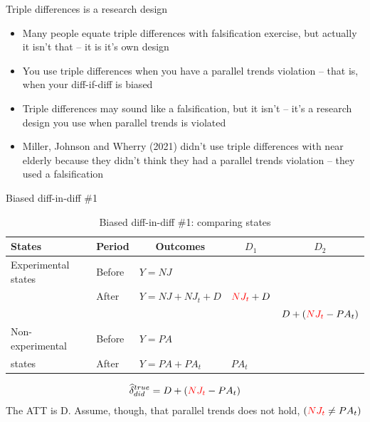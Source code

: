 \documentclass[aspectratio=169,11pt]{beamer}
\begin{document}

\begin{frame}{Triple differences is a research design}

\begin{itemize}

\item Many people equate triple differences with falsification exercise, but actually it isn't that -- it is it's own design
\item You use triple differences when you have a parallel trends violation -- that is, when your diff-if-diff is biased
\item Triple differences may sound like a falsification, but it isn't -- it's a research design you use when parallel trends is violated
\item Miller, Johnson and Wherry (2021) didn't use triple differences with near elderly because they didn't think they had a parallel trends violation -- they used a falsification
\end{itemize}

\end{frame}




\begin{frame}{Biased diff-in-diff \#1}

\begin{table}\centering
\scriptsize
		\caption{Biased diff-in-diff \#1: comparing states}
		\begin{center}
		\begin{tabular}{lll|lc}
		\toprule
		\multicolumn{1}{l}{\textbf{States}}&
		\multicolumn{1}{c}{\textbf{Period}}&
		\multicolumn{1}{c}{\textbf{Outcomes}}&
		\multicolumn{1}{c}{$D_1$}&
		\multicolumn{1}{c}{$D_2$}\\
		\midrule
		Experimental states & Before & $Y=NJ$ \\
		& After & $Y=NJ + NJ_t + D$ & $\textcolor{red}{NJ_t}+D$\\
		\midrule
		& & & & $D + (\textcolor{red}{NJ_t}- PA_t)$ \\
		\midrule
		Non-experimental  & Before & $Y=PA$ \\
		states& After & $Y=PA + PA_t$ & $PA_t$\\
		\bottomrule
		\end{tabular}
		\end{center}
	\end{table}

\begin{eqnarray*}
\widehat{\delta}^{true}_{did} = D + (\textcolor{red}{NJ_t}- PA_t)
\end{eqnarray*}The ATT is D. Assume, though, that parallel trends does not hold, $(\textcolor{red}{NJ_t} \neq PA_t)$

\end{frame}
\end{document}

